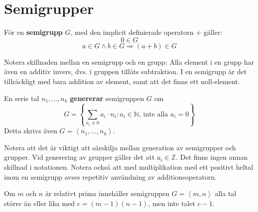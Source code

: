 \section{Semigrupper}

\begin{Definition}
För en \textbf{semigrupp} $G$, med den implicit definierade operatorn $+$ gäller:
\[0 \in G\]
\[a \in G \wedge b \in G \Longrightarrow (a + b) \in G\]
\end{Definition}

Notera skillnaden mellan en semigrupp och en grupp: Alla element i en grupp har även en additiv invers, dvs. i gruppen tillåts subtraktion. I en semigrupp är det tillräckligt med bara addition av element, samt att det finns ett noll-element.

\begin{Definition}
En serie tal $n_1, \ldots, n_k$ \textbf{genererar} semigruppen $G$ om
\[G = \left\{\sum_{a_i\neq 0} a_i \cdot n_i : a_i \in \mathbb{N}\text{, inte alla $a_i=0$}\right\}\] 
Detta skrivs även $G = \left<n_1, \ldots, n_k \right>$.
\end{Definition}

Notera att det är viktigt att särskilja mellan generation av semigrupper och grupper. Vid generering av grupper gäller det att $a_i \in \mathbb{Z}$. Det finns ingen annan skillnad i notationen. Notera också att med multiplikation med ett positivt heltal inom en semigrupp avses repetitiv användning av additionsoperatorn.

\begin{Theorem}
\label{S1}
Om $m$ och $n$ är relativt prima innehåller semigruppen $G = \left<m, n\right>$ alla tal större än eller lika med $c = (m - 1)(n - 1)$, men inte talet $c - 1$.
\end{Theorem}

